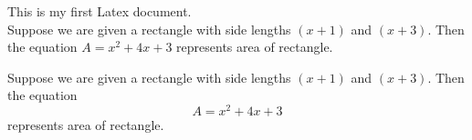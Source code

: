 \documentclass[11pt]{article}
\begin{document}
This is my first Latex document.\\
Suppose we are given a rectangle with side lengths $(x+1)$ and $(x+3)$.
Then the equation $A=x^2+4x+3$ represents area of rectangle.

Suppose we are given a rectangle with side lengths $(x+1)$ and $(x+3)$.
Then the equation $$A=x^2+4x+3$$ represents area of rectangle.
\end{document}
